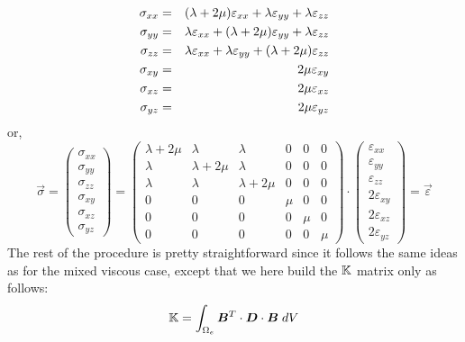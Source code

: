 \begin{eqnarray}
\sigma_{xx} &=& (\lambda+2\mu)  \varepsilon_{xx} + \lambda \varepsilon_{yy} + \lambda \varepsilon_{zz} \nonumber\\
\sigma_{yy} &=& \lambda \varepsilon_{xx} + (\lambda+2\mu)  {\varepsilon}_{yy} + \lambda \varepsilon_{zz}\nonumber\\
\sigma_{zz} &=& \lambda \varepsilon_{xx} + \lambda \varepsilon_{yy} + (\lambda+2\mu)  {\varepsilon}_{zz} \nonumber\\
\sigma_{xy} &=& 2\mu  {\varepsilon}_{xy} \nonumber\\
\sigma_{xz} &=& 2\mu  {\varepsilon}_{xz} \nonumber\\
\sigma_{yz} &=& 2\mu  {\varepsilon}_{yz} 
\end{eqnarray}
or, 
\[
\vec\sigma =
\left(
\begin{array}{c}
\sigma_{xx}\\ 
\sigma_{yy} \\
\sigma_{zz} \\
\sigma_{xy} \\
\sigma_{xz} \\
\sigma_{yz} 
\end{array}
\right)
=
\left(
\begin{array}{cccccc}
\lambda+2\mu & \lambda & \lambda & 0 & 0 & 0 \\
\lambda & \lambda+2\mu & \lambda & 0 & 0 & 0 \\
\lambda & \lambda & \lambda+2\mu & 0 & 0 & 0 \\
0 & 0 & 0 & \mu & 0 & 0\\
0 & 0 & 0 & 0 & \mu & 0\\
0 & 0 & 0 & 0 & 0 & \mu
\end{array}
\right)
\cdot
\left(
\begin{array}{c}
\varepsilon_{xx} \\
\varepsilon_{yy} \\
\varepsilon_{zz} \\
2\varepsilon_{xy} \\
2\varepsilon_{xz} \\
2\varepsilon_{yz} 
\end{array}
\right)
=\vec\varepsilon
\]
The rest of the procedure is pretty straightforward since it follows the same 
ideas as for the mixed viscous case, except that we here build the ${\mathbb{K}}$ matrix 
only as follows:
\[
{\mathbb{K}}=\int_{\Omega_e} {\bm B}^T \cdot {\bm D} \cdot {\bm B} \; dV 
\]




